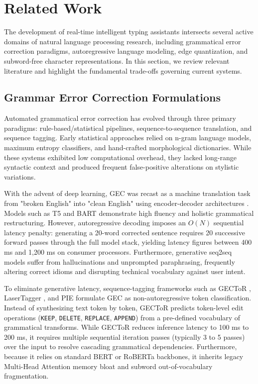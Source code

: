 \documentclass[10pt,journal,compsoc]{IEEEtran}
\begin{document}
\section{Related Work}
\label{sec:related_work}

The development of real-time intelligent typing assistants intersects several active domains of natural language processing research, including grammatical error correction paradigms, autoregressive language modeling, edge quantization, and subword-free character representations. In this section, we review relevant literature and highlight the fundamental trade-offs governing current systems.

\subsection{Grammar Error Correction Formulations}
Automated grammatical error correction has evolved through three primary paradigms: rule-based/statistical pipelines, sequence-to-sequence translation, and sequence tagging. Early statistical approaches relied on n-gram language models, maximum entropy classifiers, and hand-crafted morphological dictionaries. While these systems exhibited low computational overhead, they lacked long-range syntactic context and produced frequent false-positive alterations on stylistic variations.

With the advent of deep learning, GEC was recast as a machine translation task from "broken English" into "clean English" using encoder-decoder architectures \cite{sutskever2014sequence, vaswani2017attention, raffel2020t5}. Models such as T5 and BART \cite{lewis2020bart} demonstrate high fluency and holistic grammatical restructuring. However, autoregressive decoding imposes an $O(N)$ sequential latency penalty: generating a 20-word corrected sentence requires 20 successive forward passes through the full model stack, yielding latency figures between 400 ms and 1,200 ms on consumer processors. Furthermore, generative seq2seq models suffer from hallucinations and unprompted paraphrasing, frequently altering correct idioms and disrupting technical vocabulary against user intent.

To eliminate generative latency, sequence-tagging frameworks such as GECToR \cite{omelianchuk2020gector}, LaserTagger \cite{malmi2019encode}, and PIE \cite{awasthi2019parallel} formulate GEC as non-autoregressive token classification. Instead of synthesizing text token by token, GECToR predicts token-level edit operations (\texttt{KEEP}, \texttt{DELETE}, \texttt{REPLACE}, \texttt{APPEND}) from a pre-defined vocabulary of grammatical transforms. While GECToR reduces inference latency to 100 ms to 200 ms, it requires multiple sequential iteration passes (typically 3 to 5 passes) over the input to resolve cascading grammatical dependencies. Furthermore, because it relies on standard BERT \cite{devlin2018bert} or RoBERTa \cite{liu2019roberta} backbones, it inherits legacy Multi-Head Attention memory bloat and subword out-of-vocabulary fragmentation.
\end{document}
